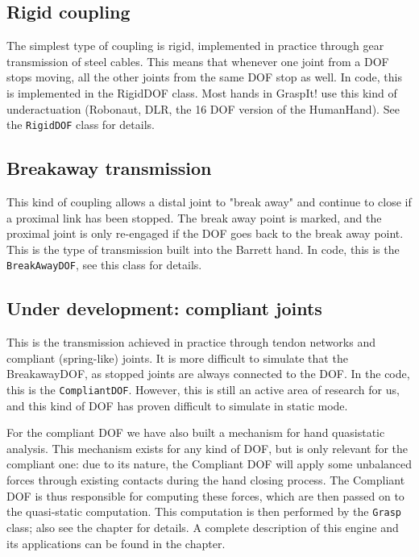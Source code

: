 \subsection{Rigid coupling}

The simplest type of coupling is rigid, implemented in practice
through gear transmission of steel cables. This means that whenever
one joint from a DOF stops moving, all the other joints from the same
DOF stop as well. In code, this is implemented in the RigidDOF
class. Most hands in GraspIt! use this kind of underactuation
(Robonaut, DLR, the 16 DOF version of the HumanHand).  See the
\texttt{RigidDOF} class for details.

\subsection{Breakaway transmission}

This kind of coupling allows a distal joint to "break away" and
continue to close if a proximal link has been stopped. The break away
point is marked, and the proximal joint is only re-engaged if the DOF
goes back to the break away point. This is the type of transmission
built into the Barrett hand. In code, this is the
\texttt{BreakAwayDOF}, see this class for details.

\subsection{Under development: compliant joints}

This is the transmission achieved in practice through tendon networks
and compliant (spring-like) joints. It is more difficult to simulate
that the BreakawayDOF, as stopped joints are always connected to the
DOF. In the code, this is the \texttt{CompliantDOF}. However, this is
still an active area of research for us, and this kind of DOF has
proven difficult to simulate in static mode.

For the compliant DOF we have also built a mechanism for hand
quasistatic analysis. This mechanism exists for any kind of DOF, but
is only relevant for the compliant one: due to its nature, the
Compliant DOF will apply some unbalanced forces through existing
contacts during the hand closing process. The Compliant DOF is thus
responsible for computing these forces, which are then passed on to
the quasi-static computation. This computation is then performed by
the \texttt{Grasp} class; also see the  chapter for details. A complete description of
this engine and its applications can be found in the
 chapter.
